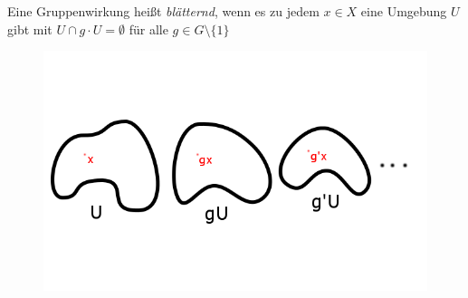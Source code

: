 \documentclass[a4paper,10pt]{scrartcl}
\begin{document}
\begin{df}\label{thm2:3.4}
 Eine Gruppenwirkung heißt \emph{blätternd}, wenn es zu jedem $x\in X$ eine Umgebung $U$ gibt mit $U\cap g\cdot U=\emptyset$ für alle $g\in G\setminus\{1\}$
\begin{figure}[H]
\centering
\includegraphics[scale=0.3]{fig75.png} 
\caption{}
\end{figure}
\end{df}
\end{document}
